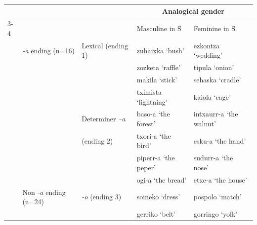 \documentclass[output=paper]{langscibook}
\begin{document}
\begin{table}
\small
\begin{tabularx}{\textwidth}{@{}l@{}lp{2.5cm}p{3cm}l}

\lsptoprule

&& & \multicolumn{2}{c}{\textbf{Analogical} \textbf{gender}}\\
\cmidrule{3-4}

&  &  & Masculine in S & Feminine in S\\
\midrule
 & \textit{{}-a} ending (n=16) & Lexical (ending 1) & zuhaixka ‘bush’       & ezkontza ‘wedding’ \\
                     &                             &                    &    zozketa ‘raffle’   &  tipula ‘onion’    \\
                     &                             &                    & makila ‘stick’        &  sehaska ‘cradle’  \\
                     &                             &                    &   tximista ‘lightning’&  kaiola ‘cage’\\




\tablevspace
&  & Determiner   \textit{–a}  & baso-a ‘the forest’  & intxaurr-a  ‘the walnut'  \\
&  &  (ending 2)         &txori-a ‘the bird’    &  esku-a ‘the hand’        \\
&  &           &piperr-a ‘the peper’  &  sudurr-a ‘the nose’      \\
&  &           &ogi-a ‘the bread’    &  etxe-a ‘the house’\\

\tablevspace
& Non \textit{-a} ending (n=24) & \textit{{}-o} (ending 3) & soineko ‘dress’   & pospolo ‘match’\\
&                                &                          &  gerriko ‘belt’     & gorringo ‘yolk’\\



\end{tabularx}
\end{table}
\end{document}

